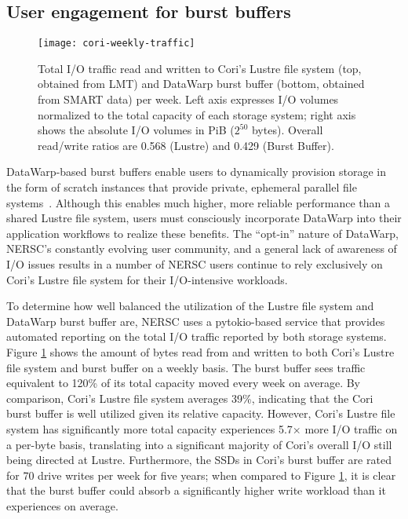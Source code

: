 \subsection{User engagement for burst buffers}
\label{sec:results/bb}

\begin{figure}
    \centering
    \texttt{[image: cori-weekly-traffic]}
    \caption{%
    Total I/O traffic read and written to Cori's Lustre file system (top, obtained from LMT) and DataWarp burst buffer (bottom, obtained from SMART data) per week.
    Left axis expresses I/O volumes normalized to the total capacity of each storage system; right axis shows the absolute I/O volumes in PiB ($2^{50}$ bytes).
    Overall read/write ratios are 0.568 (Lustre) and 0.429 (Burst Buffer).
    }
    \label{fig:cori-weekly-traffic}
    \vspace{-.2in}
\end{figure}

DataWarp-based burst buffers enable users to dynamically provision storage in the form of scratch instances that provide private, ephemeral parallel file systems~\cite{Henseler2016}.
Although this enables much higher, more reliable performance than a shared Lustre file system, users must consciously incorporate DataWarp into their application workflows to realize these benefits.
The ``opt-in'' nature of DataWarp, NERSC's constantly evolving user community, and a general lack of awareness of I/O issues results in a number of NERSC users continue to rely exclusively on Cori's Lustre file system for their I/O-intensive workloads.

To determine how well balanced the utilization of the Lustre file system and DataWarp burst buffer are, NERSC uses a pytokio-based service that provides automated reporting on the total I/O traffic reported by both storage systems.
Figure \ref{fig:cori-weekly-traffic} shows the amount of bytes read from and written to both Cori's Lustre file system and burst buffer on a weekly basis.
The burst buffer sees traffic equivalent to 120\% of its total capacity moved every week on average.
By comparison, Cori's Lustre file system averages 39\%, indicating that the Cori burst buffer is well utilized given its relative capacity.
However, Cori's Lustre file system has significantly more total capacity  experiences 5.7$\times$ more I/O traffic on a per-byte basis, translating into a significant majority of Cori's overall I/O still being directed at Lustre.
Furthermore, the SSDs in Cori's burst buffer are rated for 70 drive writes per week for five years; 
when compared to Figure \ref{fig:cori-weekly-traffic}, it is clear that the burst buffer could absorb a significantly higher write workload than it experiences on average.

